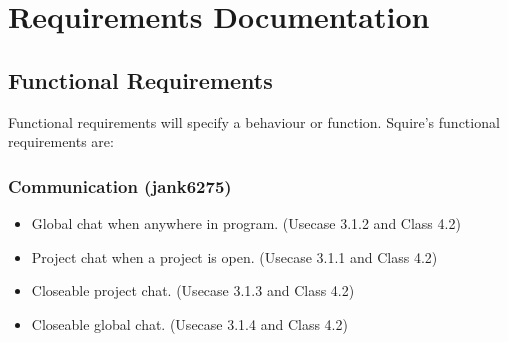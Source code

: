\documentclass[11pt]{report}
\begin{document}
\chapter{Requirements Documentation}
\section{Functional Requirements}
    Functional requirements will specify a behaviour or function. Squire's functional requirements are:
    \subsection{Communication (jank6275)}
        \begin{itemize}
            \item Global chat when anywhere in program. (Usecase 3.1.2 and Class 4.2)
            \item Project chat when a project is open. (Usecase 3.1.1 and Class 4.2)
            \item Closeable project chat. (Usecase 3.1.3 and Class 4.2)
            \item Closeable global chat. (Usecase 3.1.4 and Class 4.2)
        \end{itemize}

    
\end{document}
